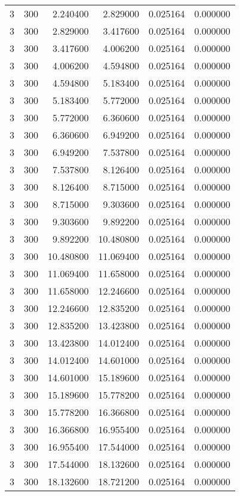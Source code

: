 \begin{longtable}{rrrrrr}
3 & 300 & 2.240400 & 2.829000 & 0.025164 & 0.000000 \\
3 & 300 & 2.829000 & 3.417600 & 0.025164 & 0.000000 \\
3 & 300 & 3.417600 & 4.006200 & 0.025164 & 0.000000 \\
3 & 300 & 4.006200 & 4.594800 & 0.025164 & 0.000000 \\
3 & 300 & 4.594800 & 5.183400 & 0.025164 & 0.000000 \\
3 & 300 & 5.183400 & 5.772000 & 0.025164 & 0.000000 \\
3 & 300 & 5.772000 & 6.360600 & 0.025164 & 0.000000 \\
3 & 300 & 6.360600 & 6.949200 & 0.025164 & 0.000000 \\
3 & 300 & 6.949200 & 7.537800 & 0.025164 & 0.000000 \\
3 & 300 & 7.537800 & 8.126400 & 0.025164 & 0.000000 \\
3 & 300 & 8.126400 & 8.715000 & 0.025164 & 0.000000 \\
3 & 300 & 8.715000 & 9.303600 & 0.025164 & 0.000000 \\
3 & 300 & 9.303600 & 9.892200 & 0.025164 & 0.000000 \\
3 & 300 & 9.892200 & 10.480800 & 0.025164 & 0.000000 \\
3 & 300 & 10.480800 & 11.069400 & 0.025164 & 0.000000 \\
3 & 300 & 11.069400 & 11.658000 & 0.025164 & 0.000000 \\
3 & 300 & 11.658000 & 12.246600 & 0.025164 & 0.000000 \\
3 & 300 & 12.246600 & 12.835200 & 0.025164 & 0.000000 \\
3 & 300 & 12.835200 & 13.423800 & 0.025164 & 0.000000 \\
3 & 300 & 13.423800 & 14.012400 & 0.025164 & 0.000000 \\
3 & 300 & 14.012400 & 14.601000 & 0.025164 & 0.000000 \\
3 & 300 & 14.601000 & 15.189600 & 0.025164 & 0.000000 \\
3 & 300 & 15.189600 & 15.778200 & 0.025164 & 0.000000 \\
3 & 300 & 15.778200 & 16.366800 & 0.025164 & 0.000000 \\
3 & 300 & 16.366800 & 16.955400 & 0.025164 & 0.000000 \\
3 & 300 & 16.955400 & 17.544000 & 0.025164 & 0.000000 \\
3 & 300 & 17.544000 & 18.132600 & 0.025164 & 0.000000 \\
3 & 300 & 18.132600 & 18.721200 & 0.025164 & 0.000000 \\

\end{longtable}

